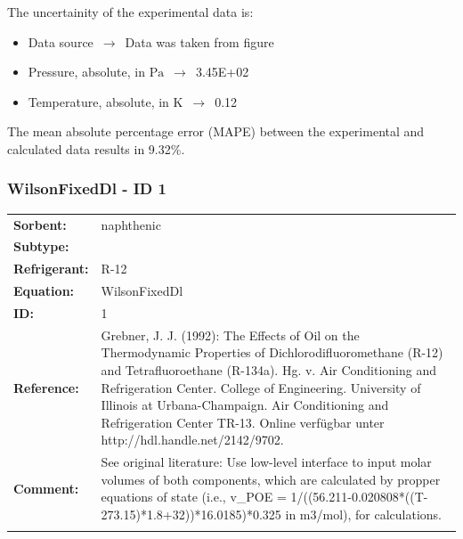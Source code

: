 The uncertainity of the experimental data is:
\begin{itemize}
\item Data source $\,\to\,$ Data was taken from figure
\item Pressure, absolute, in $\si{\pascal}$ $\,\to\,$ 3.45E+02
\item Temperature, absolute, in $\si{\kelvin}$ $\,\to\,$ 0.12
\end{itemize}

The mean absolute percentage error (MAPE) between the experimental and calculated data results in 9.32\%.
\FloatBarrier
\newpage
\subsubsection{WilsonFixedDl - ID 1}
%
\begin{tabular}[l]{|lp{11.5cm}|}
\hline
\addlinespace

\textbf{Sorbent:} & naphthenic \\
\textbf{Subtype:} &  \\
\textbf{Refrigerant:} & R-12 \\
\textbf{Equation:} & WilsonFixedDl \\
\textbf{ID:} & 1 \\
\textbf{Reference:} & Grebner, J. J. (1992): The Effects of Oil on the Thermodynamic Properties of Dichlorodifluoromethane (R-12) and Tetrafluoroethane (R-134a). Hg. v. Air Conditioning and Refrigeration Center. College of Engineering. University of Illinois at Urbana-Champaign. Air Conditioning and Refrigeration Center TR-13. Online verfügbar unter http://hdl.handle.net/2142/9702. \\
\textbf{Comment:} & See original literature: Use low-level interface to input molar volumes of both components, which are calculated by propper equations of state (i.e., v\_POE =  1/((56.211-0.020808*((T-273.15)*1.8+32))*16.0185)*0.325 in m3/mol), for calculations. \\

\addlinespace
\hline
\end{tabular}
\newline

